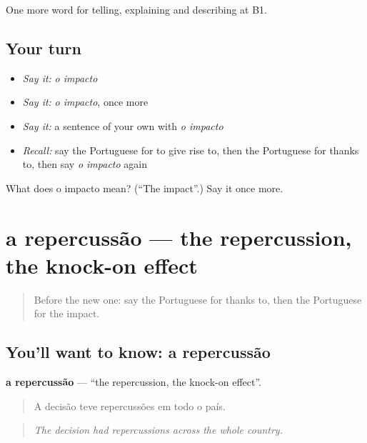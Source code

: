 \begin{grammarlens}[title={What you've built}]
One more word for telling, explaining and describing at B1.
\end{grammarlens}

\subsection*{Your turn}
\begin{itemize}
\raggedright
  \item \emph{Say it:} \emph{o impacto}
  \item \emph{Say it:} \emph{o impacto}, once more
  \item \emph{Say it:} a sentence of your own with \emph{o impacto}
  \item \emph{Recall:} say the Portuguese for to give rise to, then the Portuguese for thanks to, then say \emph{o impacto} again
\end{itemize}

\begin{tcolorbox}[breakable,colback=teal!4,colframe=teal!35!black,title={Before you move on}]
What does o impacto mean? (\textquotedblleft{}The impact\textquotedblright{}.) Say it once more.
\end{tcolorbox}
\section[a repercussão]{a repercussão — the repercussion, the knock-on effect}

\label{lesson:PT-C351-repercussao}



\begin{quote}
Before the new one: say the Portuguese for thanks to, then the Portuguese for the impact.
\end{quote}

\subsection*{You'll want to know: a repercussão}
\textbf{a repercussão} — \textquotedblleft{}the repercussion, the knock-on effect\textquotedblright{}.

\begin{quote}
A decisão teve repercussões em todo o país.
\end{quote}

\begin{quote}
\emph{The decision had repercussions across the whole country.}
\end{quote}


